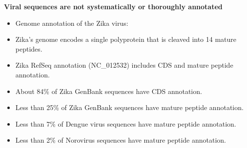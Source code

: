 \documentclass[landscape]{slides}
\begin{document}
\begin{slide}
\begin{center}
\textbf{Viral sequences are not systematically or thoroughly annotated}
\end{center}
\medskip

\small
\begin{itemize}
\item Genome annotation of the Zika virus:
\end{itemize}  


\begin{itemize}
\item Zika's genome encodes a single polyprotein that is cleaved into 14 mature peptides.
\item Zika RefSeq annotation (NC\_012532) includes CDS and mature peptide annotation.
\item About 84\% of Zika GenBank sequences have CDS annotation.
\item Less than 25\% of Zika GenBank sequences have mature peptide annotation.
\item Less than 7\% of Dengue virus sequences have mature peptide annotation.
\item Less than 2\% of Norovirus sequences have mature peptide annotation.
\end{itemize}

\vfill
\tiny {}
\end{slide}
\end{document}
